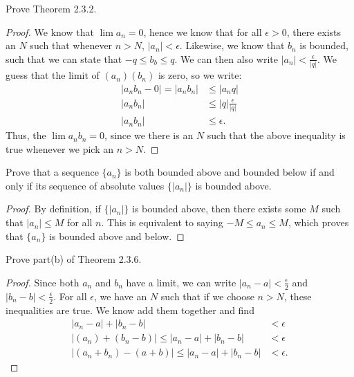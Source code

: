 \documentclass[12pt]{book}
\newenvironment{exercise}[2][Exercise]{\begin{trivlist}
\item[\hskip \labelsep {\bfseries #1}\hskip \labelsep {\bfseries #2.}]}{\end{trivlist}}
\begin{document}
\begin{exercise}{2.3.5}
Prove Theorem 2.3.2.

	\begin{proof}
	We know that $\lim a_n = 0$, hence we know that for all $\epsilon > 0$, there exists an $N$ such that whenever $n>N$, $|a_n | < \epsilon$. Likewise, we know that $b_n$ is bounded, such that we can state that $- q \leq b_b \leq q$. We can then also write $|a_n| < \frac{\epsilon}{|q|}$.  We guess that the limit of $ (a_n)(b_n)$ is zero, so we write:
		\begin{align*}
		|a_n b_n - 0| = |a_n b_n| &\leq | a_n q| \\
		|a_n b_n| &\leq |q| \frac{\epsilon}{|q|}  \\
		|a_n b_n| &\leq \epsilon.
		\end{align*}
	Thus, the $\lim a_n b_n = 0$, since we there is an $N$ such that the above inequality is true whenever we pick an $n>N$.
	\end{proof}
\end{exercise}


\begin{exercise}{2.3.6}
Prove that a sequence $\{a_n\}$ is both bounded above and bounded below if and only if its sequence of absolute values $\{|a_n|\}$ is bounded above. 

\begin{proof}
By definition, if $\{|a_n|\}$ is bounded above, then there exists some $M$ such that $|a_n| \leq M$ for all $n$. This is equivalent to saying $-M \leq a_n \leq M$, which proves that $\{a_n\}$ is bounded above and below.
\end{proof}
\end{exercise}


\begin{exercise}{2.3.7}
Prove part(b) of Theorem 2.3.6. 

\begin{proof}
	Since both $a_n$ and $b_n$ have a limit, we can write $|a_n -a| < \frac{\epsilon}{2}$ and $|b_n - b| < \frac{\epsilon}{2}$. For all $\epsilon$, we have an $N$ such that if we choose $n>N$, these inequalities are true. We know add them together and find
	\begin{align*}
	|a_n - a| + |b_n - b| &< \epsilon \\
	|(a_n) + (b_n -b) | \leq |a_n - a| + |b_n - b| &< \epsilon \\
	|(a_n + b_n) - (a+b) | \leq |a_n - a| + |b_n - b| &< \epsilon.
	\end{align*} 
\end{proof}
\end{exercise}
\end{document}
